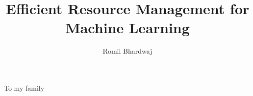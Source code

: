\documentclass[oldfontcommands]{ucbthesis}
\begin{document}
	
	
	\title{Efficient Resource Management for Machine Learning}
	\author{Romil Bhardwaj}
	
	\maketitle
	\approvalpage
	\copyrightpage
	
	
	
	\begin{frontmatter}
		
		\begin{dedication}
			\null\vfil
			\begin{center}
				To my family
			\end{center}
			\vfil\null
		\end{dedication}
		
		
		\tableofcontents
		\clearpage
		\listoffigures
		\clearpage
		\listoftables
		
		
		
	\end{frontmatter}
	
\end{document}
